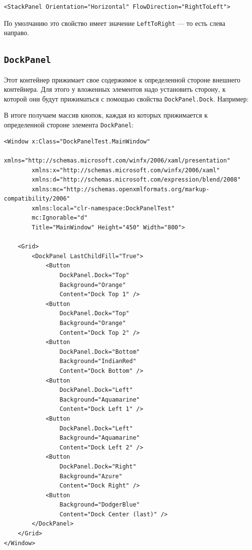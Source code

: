 \begin{verbatim}
<StackPanel Orientation="Horizontal" FlowDirection="RightToLeft">
\end{verbatim}

По умолчанию это свойство имеет значение \texttt{LeftToRight} — то есть слева направо.

\subsection{\texttt{DockPanel}}

Этот контейнер прижимает свое содержимое к определенной стороне внешнего контейнера. Для этого у вложенных элементов надо установить сторону, к которой они будут прижиматься с помощью свойства \texttt{DockPanel.Dock}. Например:

В итоге получаем массив кнопок, каждая из которых прижимается к определенной стороне элемента \texttt{DockPanel}:

\newpage

\begin{verbatim}
<Window x:Class="DockPanelTest.MainWindow"
        xmlns="http://schemas.microsoft.com/winfx/2006/xaml/presentation"
        xmlns:x="http://schemas.microsoft.com/winfx/2006/xaml"
        xmlns:d="http://schemas.microsoft.com/expression/blend/2008"
        xmlns:mc="http://schemas.openxmlformats.org/markup-compatibility/2006"
        xmlns:local="clr-namespace:DockPanelTest"
        mc:Ignorable="d"
        Title="MainWindow" Height="450" Width="800">

    <Grid>
        <DockPanel LastChildFill="True">
            <Button 
                DockPanel.Dock="Top" 
                Background="Orange" 
                Content="Dock Top 1" />
            <Button 
                DockPanel.Dock="Top" 
                Background="Orange" 
                Content="Dock Top 2" />
            <Button 
                DockPanel.Dock="Bottom" 
                Background="IndianRed" 
                Content="Dock Bottom" />
            <Button 
                DockPanel.Dock="Left" 
                Background="Aquamarine" 
                Content="Dock Left 1" />
            <Button 
                DockPanel.Dock="Left" 
                Background="Aquamarine" 
                Content="Dock Left 2" />
            <Button 
                DockPanel.Dock="Right" 
                Background="Azure" 
                Content="Dock Right" />
            <Button 
                Background="DodgerBlue" 
                Content="Dock Center (last)" />
        </DockPanel>
    </Grid>
</Window>
\end{verbatim}

